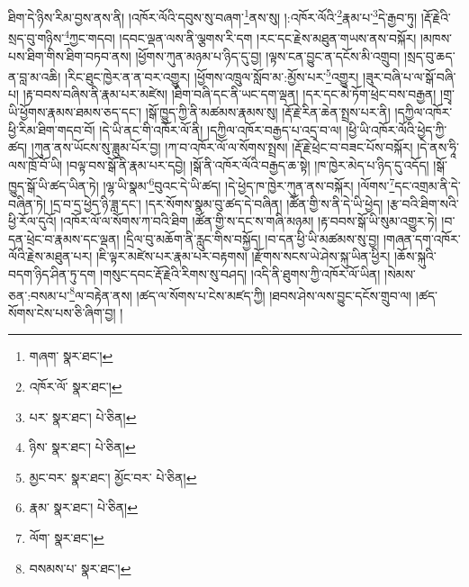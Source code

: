 ཐིག་དེ་ཉིས་རིམ་བྱས་ནས་ནི། །འཁོར་ལོའི་དབུས་སུ་བཞག་\footnote{གཞག་  སྣར་ཐང་། }ནས་སུ། །:འཁོར་ལོའི་\footnote{འཁོར་ལོ་  སྣར་ཐང་། }རྣམ་པ་\footnote{པར་  སྣར་ཐང་།  པེ་ཅིན། }དེ་རྒྱབ་ཏུ། །རྡོ་རྗེའི་སྲད་བུ་གཉིས་\footnote{ཉིས་  སྣར་ཐང་།  པེ་ཅིན། }ཀྱང་གདབ། །དབང་ལྡན་ལས་ནི་ལྕགས་རི་དག །རང་དང་རྗེས་མཐུན་གཡས་ནས་བསྐོར། །མཁས་པས་ཐིག་གིས་ཐིག་བཏབ་ནས། །ཕྱོགས་ཀུན་མཉམ་པ་ཉིད་དུ་བྱ། །ལྟས་ངན་བྱུང་ན་དངོས་མི་འགྲུབ། །སྲད་བུ་ཆད་ན་བླ་མ་འཆི། །རིང་ཐུང་ཁྱེར་ན་ན་བར་འགྱུར། །ཕྱོགས་འཁྲུལ་སློབ་མ་:མྱོས་པར་\footnote{མྱང་བར་  སྣར་ཐང་། མྱོང་བར་  པེ་ཅིན། }འགྱུར། །ཟུར་བཞི་པ་ལ་སྒོ་བཞི་པ། །རྟ་བབས་བཞིས་ནི་རྣམ་པར་མཛེས། །ཐིག་བཞི་དང་ནི་ཡང་དག་ལྡན། །དར་དང་མེ་ཏོག་ཕྲེང་བས་བརྒྱན། །གྲྭ་ཡི་ཕྱོགས་རྣམས་ཐམས་ཅད་དང་། །སྒོ་ཁྱུད་ཀྱི་ནི་མཚམས་རྣམས་སུ། །རྡོ་རྗེ་རིན་ཆེན་སྤྲས་པར་ནི། །དཀྱིལ་འཁོར་ཕྱི་རིམ་ཐིག་གདབ་བོ། །དེ་ཡི་ནང་གི་འཁོར་ལོ་ནི། །དཀྱིལ་འཁོར་བརྒྱད་པ་འདྲ་བ་ལ། །ཕྱི་ཡི་འཁོར་ལོའི་ཕྱེད་ཀྱི་ཚད། །ཀུན་ནས་ཡོངས་སུ་ཟླུམ་པོར་བྱ། །ཀ་བ་འཁོར་ལོ་ལ་སོགས་སྤྲས། །རྡོ་རྗེ་ཕྲེང་བ་བཟང་པོས་བསྐོར། །དེ་ནས་ཧཱི་ལས་ཁྲོ་བོ་ཡི། །བལྟ་བས་སྒོ་ནི་རྣམ་པར་དབྱེ། །སྒོ་ནི་འཁོར་ལོའི་བརྒྱད་ཆ་སྟེ། །ཁ་ཁྱེར་མེད་པ་ཉིད་དུ་འདོད། །སྒོ་ཁྱུད་སྒོ་ཡི་ཚད་ཡིན་ཏེ། །ལྷ་ཡི་སྣམ་\footnote{རྣམ་  སྣར་ཐང་།  པེ་ཅིན། }བུའང་དེ་ཡི་ཚད། །དེ་ཕྱེད་ཁ་ཁྱེར་ཀུན་ནས་བསྐོར། །ལོགས་\footnote{ལོག་  སྣར་ཐང་། }དང་འགྲམ་ནི་དེ་བཞིན་ཏེ། །དྲ་བ་དྲ་ཕྱེད་ཉི་ཟླ་དང་། །དར་སོགས་སྣམ་བུ་ཚད་དེ་བཞིན། །ཚོན་གྱི་ས་ནི་དེ་ཡི་ཕྱེད། །རྩ་བའི་ཐིག་སའི་ཕྱི་རོལ་དུའོ། །འཁོར་ལོ་ལ་སོགས་ཀ་བའི་ཐིག །ཚོན་གྱི་ས་དང་ས་གཞི་མཉམ། །རྟ་བབས་སྒོ་ཡི་སུམ་འགྱུར་ཏེ། །བ་དན་ཕྲེང་བ་རྣམས་དང་ལྡན། །དྲིལ་བུ་མཆོག་ནི་རླུང་གིས་བསྐྱོད། །བ་དན་ཕྱི་ཡི་མཚམས་སུ་བྱ། །གཞན་དག་འཁོར་ལོའི་རྗེས་མཐུན་པར། །ཇི་ལྟར་མཛེས་པར་རྣམ་པར་བརྟགས། །རྫོགས་སངས་ཡེ་ཤེས་སྐུ་ཡིན་ཕྱིར། །ཆོས་སྐུའི་བདག་ཉིད་ཤིན་ཏུ་དག །གསུང་དབང་རྡོ་རྗེའི་རིགས་སུ་བཤད། །འདི་ནི་ཐུགས་ཀྱི་འཁོར་ལོ་ཡིན། །སེམས་ཅན་:བསམ་པ་\footnote{བསམས་པ་  སྣར་ཐང་། }ལ་བརྟེན་ནས། །ཚད་ལ་སོགས་པ་ངེས་མཛད་ཀྱི། །ཐབས་ཤེས་ལས་བྱུང་དངོས་གྲུབ་ལ། །ཚད་སོགས་ངེས་པས་ཅི་ཞིག་བྱ། །
